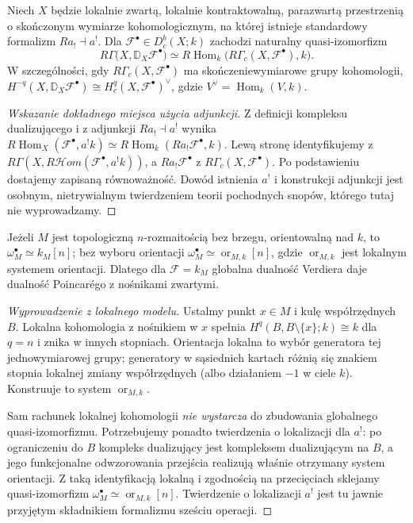 \begin{twierdzenie}
\label{thm:verdier-global-v12}
Niech $X$ będzie lokalnie zwartą, lokalnie kontraktowalną,
parazwartą przestrzenią o skończonym wymiarze kohomologicznym,
na której istnieje standardowy formalizm $Ra_!\dashv a^!$.
Dla $\mathcal F^\bullet\in D^b_c(X;k)$ zachodzi
naturalny quasi-izomorfizm
\[
R\Gamma\bigl(X,\mathbb D_X\mathcal F^\bullet\bigr)
\simeq R\!\operatorname{Hom}_k
\bigl(R\Gamma_c(X,\mathcal F^\bullet),k\bigr).
\]
W szczególności, gdy $R\Gamma_c(X,\mathcal F^\bullet)$
ma skończeniewymiarowe grupy kohomologii,
$H^{-q}(X,\mathbb D_X\mathcal F^\bullet)
\cong H_c^q(X,\mathcal F^\bullet)^\vee$,
gdzie $V^\vee=\operatorname{Hom}_k(V,k)$.
\end{twierdzenie}
\begin{proof}[Wskazanie dokładnego miejsca użycia adjunkcji]
Z definicji kompleksu dualizującego i z adjunkcji
$Ra_!\dashv a^!$ wynika
$R\!\operatorname{Hom}_X(\mathcal F^\bullet,a^!k)
\simeq R\!\operatorname{Hom}_k(Ra_!\mathcal F^\bullet,k)$.
Lewą stronę identyfikujemy z
$R\Gamma(X,R\mathcal Hom(\mathcal F^\bullet,a^!k))$,
a $Ra_!\mathcal F^\bullet$ z
$R\Gamma_c(X,\mathcal F^\bullet)$.
Po podstawieniu dostajemy zapisaną równoważność.
Dowód istnienia $a^!$ i konstrukcji adjunkcji jest
osobnym, nietrywialnym twierdzeniem teorii pochodnych
snopów, którego tutaj nie wyprowadzamy.
\end{proof}

\begin{twierdzenie}
\label{thm:verdier-manifold-v12}
Jeżeli $M$ jest topologiczną $n$-rozmaitością bez brzegu,
orientowalną nad $k$, to
$\omega_M^\bullet\simeq k_M[n]$; bez wyboru orientacji
$\omega_M^\bullet\simeq\operatorname{or}_{M,k}[n]$,
gdzie $\operatorname{or}_{M,k}$ jest lokalnym systemem orientacji.
Dlatego dla $\mathcal F=k_M$ globalna dualność Verdiera
daje dualność Poincarégo z nośnikami zwartymi.
\end{twierdzenie}
\begin{proof}[Wyprowadzenie z lokalnego modelu]
Ustalmy punkt $x\in M$ i kulę współrzędnych $B$.
Lokalna kohomologia z nośnikiem w $x$ spełnia
$H^q(B,B\setminus\{x\};k)\cong k$ dla $q=n$
i znika w innych stopniach. Orientacja lokalna to
wybór generatora tej jednowymiarowej grupy; generatory
w sąsiednich kartach różnią się znakiem stopnia
lokalnej zmiany współrzędnych (albo działaniem $-1$
w ciele $k$). Konstruuje to system $\operatorname{or}_{M,k}$.

Sam rachunek lokalnej kohomologii \emph{nie wystarcza}
do zbudowania globalnego quasi-izomorfizmu. Potrzebujemy
ponadto twierdzenia o lokalizacji dla $a^!$:
po ograniczeniu do $B$ kompleks dualizujący jest
kompleksem dualizującym na $B$, a jego funkcjonalne
odwzorowania przejścia realizują właśnie otrzymany
system orientacji. Z taką identyfikacją lokalną i
zgodnością na przecięciach sklejamy quasi-izomorfizm
$\omega_M^\bullet\simeq\operatorname{or}_{M,k}[n]$.
Twierdzenie o lokalizacji $a^!$ jest tu jawnie
przyjętym składnikiem formalizmu sześciu operacji.
\end{proof}

